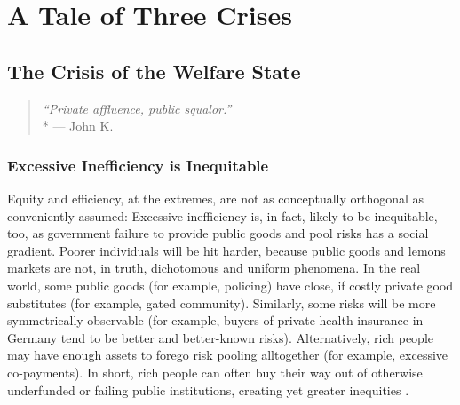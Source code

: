 


\chapter[Three Crises]{A Tale of Three Crises} \label{chap:3-crises}


\section{The Crisis of the Welfare State}

\begin{quote}
	\emph{``Private affluence, public squalor.''}\\*
	--- John K. \citealt{Galbraith1959}
\end{quote}




\subsection{Excessive Inefficiency is Inequitable} \label{sec:InefficiencyIsInequitable}
Equity and efficiency, at the extremes, are not as conceptually orthogonal as conveniently assumed: Excessive inefficiency is, in fact, likely to be inequitable, too, as government failure to provide public goods and pool risks has a social gradient. Poorer individuals will be hit harder, because public goods and lemons markets are not, in truth, dichotomous and uniform phenomena. In the real world, some public goods (for example, policing) have close, if costly private good substitutes (for example, gated community). Similarly, some risks will be more symmetrically observable (for example, buyers of private health insurance in Germany tend to be better and better-known risks). Alternatively, rich people may have enough assets to forego risk pooling alltogether (for example, excessive co-payments). In short, rich people can often buy their way out of otherwise underfunded or failing public institutions, creating yet greater inequities \citep{Barry2002}.

